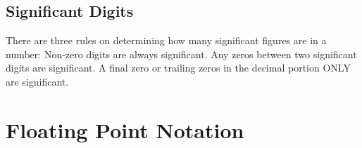 
\subsection{Significant Digits}
There are three rules on determining how many significant figures are in a number: Non-zero digits are always significant. Any zeros between two significant digits are significant. A final zero or trailing zeros in the decimal portion ONLY are significant.

\section{Floating Point Notation}
